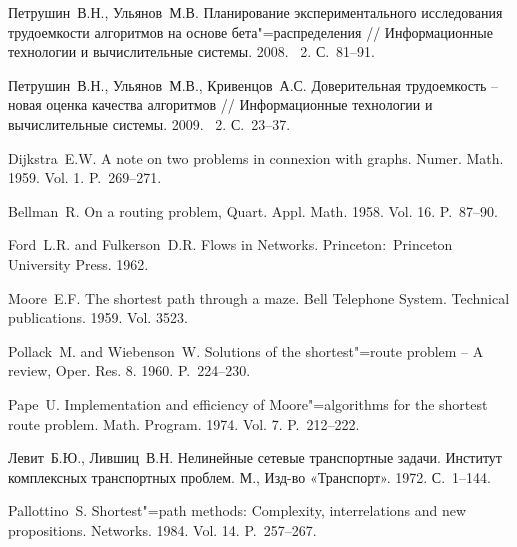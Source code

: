 \documentclass[a4paper,fontsize=14pt]{article}
\newcommand*{\No}{\textnumero}
\begin{document}
\begin{thebibliography}{10} \label{sec:sources}

	 Петрушин~В.\:Н., Ульянов~М.\:В. Планирование экспериментального исследования трудоемкости алгоритмов на основе бета"=распределения // Информационные технологии и вычислительные системы. 2008. \No~2. С.~81--91.
	
	 Петрушин~В.\:Н., Ульянов~М.\:В., Кривенцов~А.\:С. Доверительная трудоемкость – новая оценка качества алгоритмов // Информационные технологии и вычислительные системы. 2009. \No~2. С.~23--37.
		
	 Dijkstra~E.\:W. A note on two problems in connexion with graphs. Numer. Math. 1959. Vol. 1. P.~269--271.
	
	 Bellman~R. On a routing problem, Quart. Appl. Math. 1958. Vol. 16. P.~87--90.
	
	 Ford~L.\:R. and Fulkerson~D.\:R. Flows in Networks. Princeton:~Princeton University Press. 1962.
	
	 Moore~E.\:F. The shortest path through a maze. Bell Telephone System. Technical publications. 1959. Vol. 3523.
	
	 Pollack~M. and Wiebenson~W. Solutions of the shortest"=route problem – A review, Oper. Res. 8. 1960. P.~224--230.
	
	 Pape~U. Implementation and efficiency of Moore"=algorithms for the shortest route problem. Math. Program. 1974. Vol. 7. P.~212--222.
	
	 Левит~Б.\:Ю., Лившиц~В.\:Н. Нелинейные сетевые транспортные задачи. Институт комплексных транспортных проблем. М., Изд-во «Транспорт». 1972. С.~1--144.
	
	 Pallottino~S. Shortest"=path methods: Complexity, interrelations and new propositions. Networks. 1984. Vol. 14. P.~257--267.

\end{thebibliography}
\end{document}
